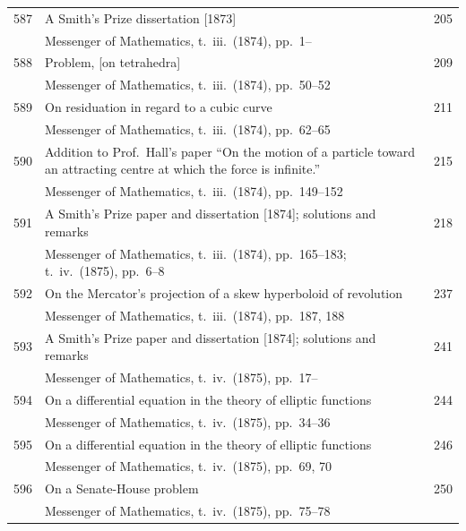 \documentclass[12pt,a4paper]{article}
\theoremstyle{plain}
\theoremstyle{definition}
\begin{document}
\begin{longtable}{r @{. } p{4.8in} r}
587 & A Smith's Prize dissertation [1873] & 205 \\
  & Messenger of Mathematics, t.\ iii.\ (1874), pp.\ 1-- & \\ 

588 & Problem, [on tetrahedra] & 209 \\
  & Messenger of Mathematics, t.\ iii.\ (1874), pp.\ 50--52 & \\ 

589 & On residuation in regard to a cubic curve & 211 \\
  & Messenger of Mathematics, t.\ iii.\ (1874), pp.\ 62--65 & \\ 

590 & Addition to Prof.\ Hall's paper ``On the motion of a particle toward an attracting centre at which the force is infinite.'' & 215 \\
  & Messenger of Mathematics, t.\ iii.\ (1874), pp.\ 149--152 & \\ 

591 & A Smith's Prize paper and dissertation [1874]; solutions and remarks & 218 \\
  & Messenger of Mathematics, t.\ iii.\ (1874), pp.\ 165--183; t.\ iv.\ (1875), pp.\ 6--8 & \\ 

592 & On the Mercator's projection of a skew hyperboloid of revolution & 237 \\
  & Messenger of Mathematics, t.\ iii.\ (1874), pp.\ 187, 188 & \\ 

593 & A Smith's Prize paper and dissertation [1874]; solutions and remarks & 241 \\
  & Messenger of Mathematics, t.\ iv.\ (1875), pp.\ 17-- & \\ 

594 & On a differential equation in the theory of elliptic functions & 244 \\
  & Messenger of Mathematics, t.\ iv.\ (1875), pp.\ 34--36 & \\ 

595 & On a differential equation in the theory of elliptic functions & 246 \\
  & Messenger of Mathematics, t.\ iv.\ (1875), pp.\ 69, 70 & \\ 

596 & On a Senate-House problem & 250 \\
  & Messenger of Mathematics, t.\ iv.\ (1875), pp.\ 75--78 & \\ 


\end{longtable}
\end{document}
